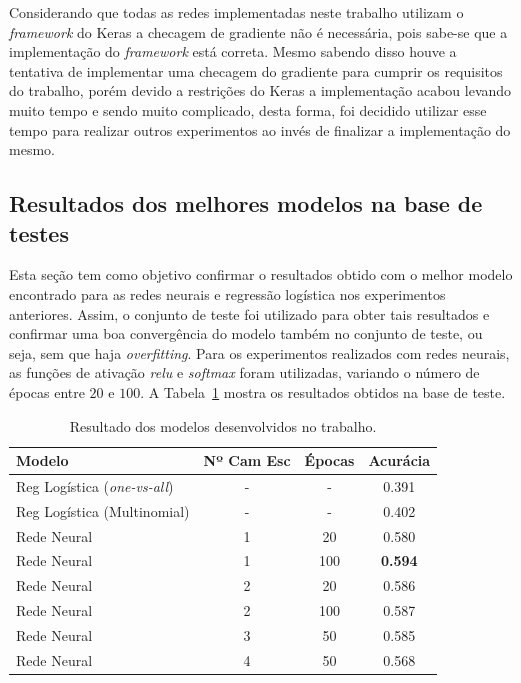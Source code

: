 \documentclass[conference]{IEEEtran}
\begin{document}
Considerando que todas as redes implementadas neste trabalho utilizam o \emph{framework} do Keras a checagem de gradiente não é necessária, pois sabe-se que a implementação do \emph{framework} está correta. Mesmo sabendo disso houve a tentativa de implementar uma checagem do gradiente para cumprir os requisitos do trabalho, porém devido a restrições do Keras a implementação acabou levando muito tempo e sendo muito complicado, desta forma, foi decidido utilizar esse tempo para realizar outros experimentos ao invés de finalizar a implementação do mesmo.

\subsection{Resultados dos melhores modelos na base de testes}

Esta seção tem como objetivo confirmar o resultados obtido com o melhor modelo encontrado para as redes neurais e regressão logística nos experimentos anteriores. Assim, o conjunto de teste foi utilizado para obter tais resultados e confirmar uma boa convergência do modelo também no conjunto de teste, ou seja, sem que haja \emph{overfitting}. Para os experimentos realizados com redes neurais, as funções de ativação \emph{relu} e \emph{softmax} foram utilizadas, variando o número de épocas entre $20$ e $100$. A Tabela~\ref{tab:result} mostra os resultados obtidos na base de teste.

\begin{table}[h!]
	\centering	
	\begin{tabular}{lccc} \toprule
		\textbf{Modelo} & \textbf{Nº Cam Esc} & \textbf{Épocas} & \textbf{Acurácia}    \\ \toprule 	
		Reg Logística (\emph{one-vs-all}) & - & - & 0.391 \\
		Reg Logística (Multinomial) & - & - & 0.402 \\  \toprule 
	    Rede Neural & 1 & 20  & 0.580 \\
   	    Rede Neural & 1 & 100 & \textbf{0.594} \\
	    Rede Neural & 2 & 20  & 0.586 \\
	    Rede Neural & 2 & 100 & 0.587 \\
	    Rede Neural & 3 & 50  & 0.585 \\
   	    Rede Neural & 4 & 50 &  0.568\\
	    
		\bottomrule      
	\end{tabular}
	\caption{Resultado dos modelos desenvolvidos no trabalho.}
	\label{tab:result}
\end{table}
\end{document}
